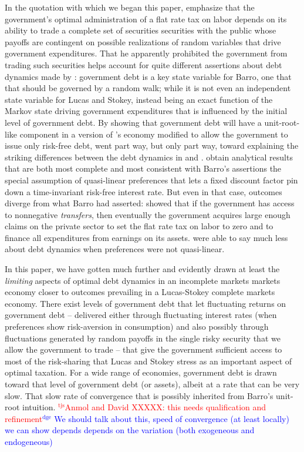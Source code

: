 \documentclass[12pt]{article}
\newcommand{\dge}[1]{\textcolor{blue}{$^{\textrm{dge}}${#1}}}
\newcommand{\tjs}[1]{\textcolor{red}{$^{\textrm{tjs}}${#1}}}
\begin{document}
In the quotation  with which we began this paper, \citet{LucasJr.1983} emphasize that the government's optimal administration of a flat rate
tax on labor depends on its ability to trade a complete set of securities securities with the public whose payoffs are contingent on 
possible realizations of random variables that drive
government expenditures.  That he apparently prohibited the government from trading such securities helps account for quite different
assertions about debt dynamics made by \citet{Barro1979}: government debt is a key state variable for Barro, one that that should be governed by
a random walk; while it is not even an independent state variable for Lucas and Stokey, instead being an exact function of the Markov state driving 
government expenditures that is influenced by the initial level of government debt.  By showing that government debt will have a unit-root-like component
in a version 
of \citeauthor{LucasJr.1983}'s economy modified to allow the government to issue only risk-free debt, \citet{Aiyagari2002} went part way, but only part way,
toward explaining  the striking differences between the debt dynamics  in \citeauthor{LucasJr.1983} and  \citeauthor{Barro1979}.  
 \citeauthor{Aiyagari2002} obtain analytical results that are both most   complete and most consistent with Barro's assertions
  the special assumption of   quasi-linear preferences that lets  a fixed discount factor pin down a time-invariant  risk-free interest rate.
  But even in that case, outcomes diverge from what Barro had asserted: \citeauthor{Aiyagari2002} showed that if the government has access to 
  nonnegative {\em transfers}, then eventually the government acquires large enough claims on the private sector to set the flat rate tax on labor to zero
  and to finance all expenditures from earnings on its assets.  \citeauthor{Aiyagari2002} were able to say much less about debt dynamics when preferences were
  not quasi-linear.  
  
  In this paper, we have gotten much further and evidently  drawn at least the {\em limiting} aspects of optimal debt dynamics in an  incomplete markets
  markets economy closer to outcomes prevailing in a Lucas-Stokey complete markets economy.  
  There exist levels of government debt that let fluctuating returns on government debt -- delivered either through fluctuating interest rates (when
  preferences show risk-aversion in consumption) and also possibly through fluctuations generated by random payoffs in the single risky security
  that we allow the government to trade -- that give the government sufficient access to most of the risk-sharing that Lucas and Stokey stress as an important
  aspect of optimal taxation.  For a wide range of economies, government debt is drawn toward that level of government debt (or assets), albeit at
  a rate that can be very slow.  That slow rate of convergence that is possibly inherited from Barro's unit-root intuition.  
  \tjs{Anmol and David XXXXX: this needs qualification and refinement}\dge{  We should talk about this, speed of convergence (at least locally) we can show depends depends on the variation (both exogeneous and endogeneous)}
  
\end{document}
